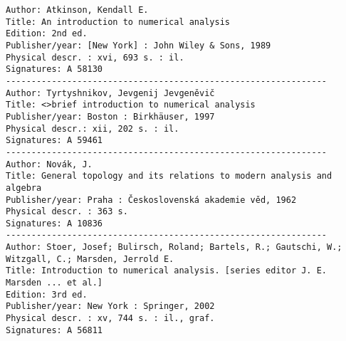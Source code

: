 \begin{verbatim}  
Author: Atkinson, Kendall E.
Title: An introduction to numerical analysis
Edition: 2nd ed.
Publisher/year: [New York] : John Wiley & Sons, 1989
Physical descr. : xvi, 693 s. : il.
Signatures: A 58130
---------------------------------------------------------------
Author: Tyrtyshnikov, Jevgenij Jevgeněvič
Title: <>brief introduction to numerical analysis
Publisher/year: Boston : Birkhäuser, 1997
Physical descr.: xii, 202 s. : il.
Signatures: A 59461
---------------------------------------------------------------
Author: Novák, J.
Title: General topology and its relations to modern analysis and algebra
Publisher/year: Praha : Československá akademie věd, 1962
Physical descr. : 363 s.
Signatures: A 10836
---------------------------------------------------------------
Author: Stoer, Josef; Bulirsch, Roland; Bartels, R.; Gautschi, W.; Witzgall, C.; Marsden, Jerrold E.
Title: Introduction to numerical analysis. [series editor J. E. Marsden ... et al.]
Edition: 3rd ed.
Publisher/year: New York : Springer, 2002
Physical descr. : xv, 744 s. : il., graf.
Signatures: A 56811
\end{verbatim} 